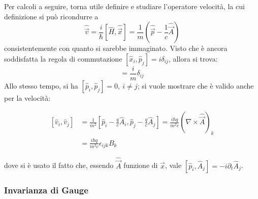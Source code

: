 \documentclass[11pt, a4paper]{scrartcl} %
\numberwithin{equation}{subsection}
\theoremstyle{style2}
\theoremstyle{style1}
\newenvironment{boxenv}[1][]{
    \begin{eqbox}[#1]
    }{
   \end{eqbox}
}
\begin{document}
Per calcoli a seguire, torna utile definire e studiare l'operatore velocit\`a, la cui definizione si pu\`o ricondurre a 
\begin{equation}
	\hat{\vec{v}}=\frac{i}{\hbar } [\hat{H},\hat{\vec{x}}] = \frac{1}{m} \left(\hat{\vec{p}} - \frac{1}{c} \hat{\vec{A}}\right) 
\end{equation}
consistentemente con quanto si sarebbe immaginato.
Visto che \`e ancora soddisfatta la regola di commutazione $[\hat{x}_i , \hat{p}_j ] = i \delta _{ij} $, allora si trova:
\begin{equation}
	[\hat{x}_i , \hat{v}_j] = \frac{i}{m}\delta _{ij} 
\end{equation}
Allo stesso tempo, si ha $[\hat{p}_i, \hat{p}_j ] = 0, \ i \neq j $; si vuole mostrare che \`e valido anche per la velocit\`a:
\begin{boxenv}[]
\begin{equation}
\begin{split}
	[\hat{v}_i, \hat{v}_j] &= \frac{1}{m^2}\left[ \hat{p}_i - \frac{q}{c}\hat{A}_i , \hat{p}_j - \frac{q}{c}\hat{A}_j \right] = \frac{i\hbar q}{m^2c}\left(\nabla \times \hat{\vec{A}}\right) _k\\
			       &=\frac{i\hbar q}{m^2c}\epsilon _{ijk} B_k
\end{split}
\end{equation}
\end{boxenv}
\noindent dove si \`e usato il fatto che, essendo $\hat{\vec{A}}$ funzione di $\hat{\vec{x}}$, vale $[\hat{p}_i , \hat{A}_j ] = - i \partial _t \hat{A}_j$.

\subsubsection{Invarianza di Gauge}
\end{document}
